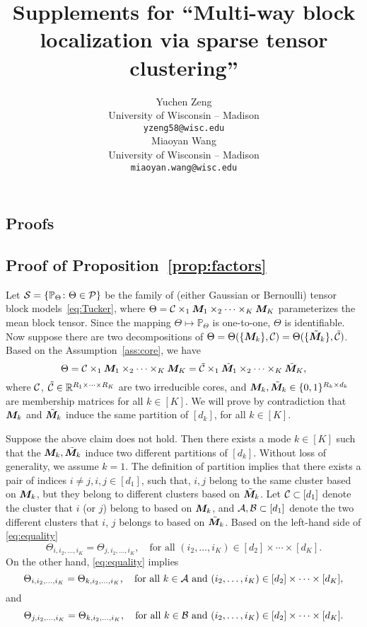 \documentclass{article}
\title{Supplements for ``Multi-way block localization via sparse tensor clustering''}
\author{%
Yuchen Zeng \\
University of Wisconsin -- Madison\\
 \texttt{yzeng58@wisc.edu} \\
\And
Miaoyan Wang \\
University of Wisconsin -- Madison\\
\texttt{miaoyan.wang@wisc.edu} \\
}
\begin{document}
\maketitle


\begin{appendices}
\section{Proofs}
	
\subsection{Proof of Proposition~\ref{prop:factors}}
Let $\mathcal{S}=\{\mathbb{P}_{\Theta}\colon \Theta\in\mathcal{P}\}$ be the family of (either Gaussian or Bernoulli) tensor block models~\eqref{eq:Tucker}, where $\Theta=\mathcal{C} \times_1\bm M_1\times_2\cdots\times_K\bm M_K$ parameterizes the mean block tensor. Since the mapping $\Theta\mapsto\mathbb{P}_{\Theta}$ is one-to-one, $\Theta$ is identifiable. Now suppose there are two decompositions of $\Theta=\Theta(\{\bm M_k\}, \mathcal{C})=\Theta(\{\tilde {\bm M}_k\}, \tilde {\mathcal{C}})$. Based on the Assumption~\ref{ass:core}, we have
\begin{equation}\label{eq:equality}
\Theta=\mathcal{C} \times_1\bm M_1\times_2\cdots\times_K\bm M_K=\tilde {\mathcal{C}} \times_1\tilde {\bm M}_1\times_2\cdots\times_K\tilde  {\bm M}_K,
\end{equation}
where $\mathcal{C}$, $\tilde {\mathcal{C}}\in\mathbb{R}^{R_1\times \cdots \times R_K}$ are two irreducible cores, and $\bm M_k,\tilde {\bm M}_k\in\{0,1\}^{R_k\times d_k}$ are membership matrices for all $k\in[K]$. We will prove by contradiction that $\bm M_k$ and $\tilde {\bm M}_k$ induce the same partition of $[d_k]$, for all $k\in[K]$. 

Suppose the above claim does not hold. Then there exists a mode $k\in[K]$ such that the $\bm M_k, \tilde {\bm M}_k$ induce two different partitions of $[d_k]$. Without loss of generality, we assume $k=1$. The definition of partition implies that there exists a pair of indices $i\neq j, i,j\in[d_1]$, such that, $i,j$ belong to the same cluster based on $\bm M_k$, but they belong to different clusters based on $\tilde {\bm M}_k$. Let $\mathcal{C}\subset [d_1] $ denote the cluster that $i$ (or $j$) belong to based on $\bm M_k$, and $\mathcal{A}, \mathcal{B}\subset[d_1]$ denote the two different clusters that $i$, $j$ belongs to based on $\tilde {\bm M}_k$. Based on the left-hand side of \eqref{eq:equality}
\begin{equation}\label{eq:cluster1}
\Theta_{i,i_2,\ldots,i_K}=\Theta_{j,i_2,\ldots,i_K},\quad \text{for all } (i_2,\ldots,i_K)\in[d_2]\times\cdots\times [d_K].
\end{equation}
 On the other hand, \eqref{eq:equality} implies
\begin{equation}\label{eq:cluster2}
\Theta_{i,i_2,\ldots,i_K}=\Theta_{k,i_2,\ldots,i_K},\quad \text{for all } k\in \mathcal{A} \text{ and }(i_2,\ldots,i_K)\in[d_2]\times\cdots\times [d_K],
\end{equation}
and
\begin{equation}\label{eq:cluster3}
\Theta_{j,i_2,\ldots,i_K}=\Theta_{k,i_2,\ldots,i_K},\quad \text{for all } k\in \mathcal{B} \text{ and }(i_2,\ldots,i_K)\in[d_2]\times\cdots\times [d_K].
\end{equation}


\end{appendices}
\end{document}
